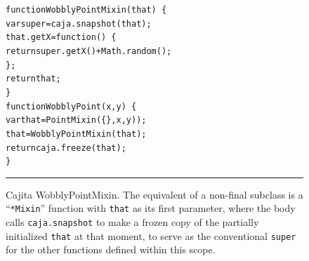 \documentclass[letterpaper,twocolumn,10pt]{article}
\newcommand{\code}[1]{{\tt {#1}}}              %
\begin{document}
\begin{figure}[t!]
\begin{alltt}
function WobblyPointMixin(that)\ \{
  var super = caja.snapshot(that);
  that.getX = function()\ \{ 
    return super.getX() + Math.random(); 
  \};
  return that;
\}
function WobblyPoint(x, y)\ \{
  var that = PointMixin(\{\}, x, y));
  that = WobblyPointMixin(that);
  return caja.freeze(that);
\}
\end{alltt}

\caption[Cajita WobblyPointMixin.]{Cajita WobblyPointMixin. The equivalent of 
a non-final subclass is a ``\code{*Mixin}'' function with \code{that} as its 
first parameter, where the body calls \code{caja.snapshot} to make a frozen 
copy of the partially initialized \code{that} at that moment, to serve as the 
conventional \code{super} for the other functions defined within this scope. 
\\ } \hrule
\label{fig:cajita-super-wobbly-point} 
\end{figure}
\end{document}
